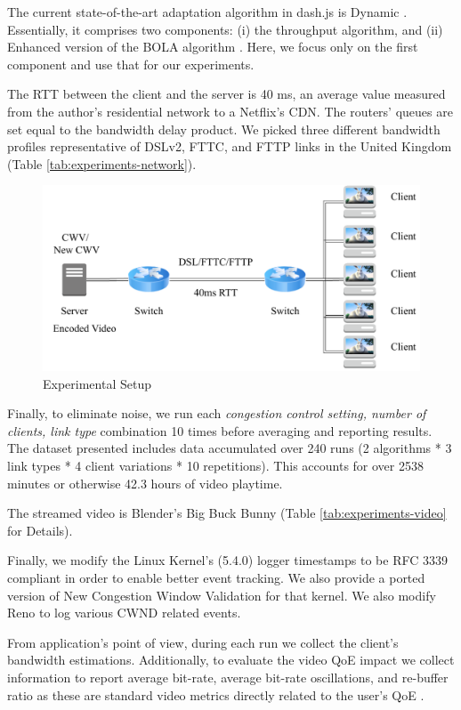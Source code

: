 \documentclass[10pt,sigconf]{acmart}
\begin{document}
The current state-of-the-art adaptation algorithm in dash.js is Dynamic \cite{Spiteri-2019-from-theory-to-practice-sabre}. Essentially, it comprises two components: (i) the throughput algorithm, and (ii) Enhanced version of the BOLA algorithm \cite{Spiteri-2016-BOLA}. Here, we focus only on the first component and use that for our experiments.

The RTT between the client and the server is 40 ms, an average value measured from the author's residential network to a Netflix's CDN. The routers' queues are set equal to the bandwidth delay product. We picked three different bandwidth profiles representative of DSLv2, FTTC, and FTTP links in the United Kingdom \cite{online-ofcom-report} (Table \ref{tab:experiments-network}).

\begin{figure}
  \centering
  \includegraphics[width=.5\textwidth]{figures/setup.pdf}
  \caption{Experimental Setup}
  \label{fig:experimental-setup}
\end{figure}

Finally, to eliminate noise, we run each \textit{congestion control setting, number of clients, link type} combination 10 times before averaging and reporting results. The dataset presented includes data accumulated over 240 runs (2 algorithms * 3 link types * 4 client variations * 10 repetitions). This accounts for over 2538 minutes or otherwise 42.3 hours of video playtime.

The streamed video is Blender's Big Buck Bunny \cite{online-bbb} (Table \ref{tab:experiments-video} for Details).

Finally, we modify the Linux Kernel's (5.4.0) logger timestamps to be RFC 3339 compliant in order to enable better event tracking. We also provide a ported version of New Congestion Window Validation \cite{rfc7661-2015-fairhurst-new-cwnd-validation} for that kernel. We also modify Reno to log various CWND related events.

From application's point of view, during each run we collect the client's bandwidth estimations. Additionally, to evaluate the video QoE impact we collect information to report average bit-rate, average bit-rate oscillations, and re-buffer ratio as these are standard video metrics directly related to the user's QoE \cite{Spiteri-2019-from-theory-to-practice-sabre, Yin-2015-a-control-theoritic-approach, Dobrian-2013-understanding-the-impact-of-video-quality}.
\end{document}

